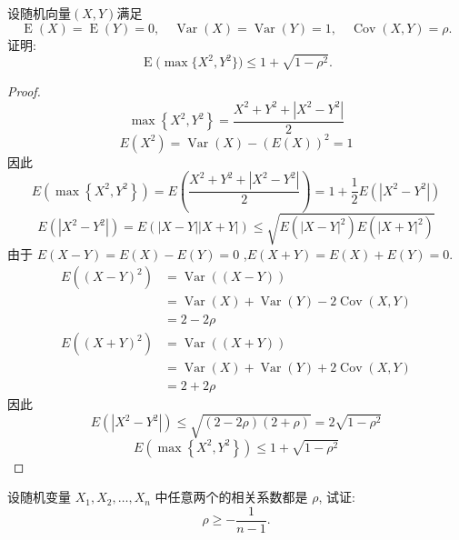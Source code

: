 \documentclass[../main.tex]{subfiles}
\begin{document}
\begin{exercise}{}{}
设随机向量\((X,Y)\)满足
\[
\operatorname{E}(X)=\operatorname{E}(Y)=0,\quad \operatorname{Var}(X)=\operatorname{Var}(Y)=1,\quad \operatorname{Cov}(X,Y)=\rho.
\]
证明:
\[
\operatorname{E}\bigl(\max\{X^{2},Y^{2}\}\bigr)\le 1+\sqrt{1-\rho^{2}}.
\]
\end{exercise}

\begin{proof}
   \[
   \max \left\{ X^{2},Y^{2} \right\}= \frac{X^{2}+ Y^{2}+ \left| X^{2}-Y^{2} \right|  }{2 } 
   \] \[
   E\left( X^{2} \right)= \operatorname{Var}\left( X \right)-\left( E\left( X \right)  \right)^{2}= 1   
   \]因此 \[
   E\left( \max \left\{ X^{2},Y^{2} \right\} \right)= E\left( \frac{X^{2}+ Y^{2}+ \left| X^{2}-Y^{2} \right|  }{2 }  \right)= 1+  \frac{1}{2}E\left( \left| X^{2}-Y^{2} \right|  \right)   
   \] \[
   E\left( \left| X^{2}-Y^{2}  \right| \right)= E\left( \left| X-Y \right|\left| X+ Y \right|   \right)  \le \sqrt{E\left( \left| X-Y \right|^{2}  \right)E\left( \left| X+ Y \right|^{2}  \right)  }
   \]由于 \(  E\left( X-Y \right)= E\left( X \right)-E\left( Y \right)= 0     \) ,\(  E\left( X+ Y \right)= E\left( X \right)+ E\left( Y \right)= 0     \). \[
   \begin{aligned}
   E\left( \left( X-Y \right)^{2}  \right)&=\operatorname{Var}\left( \left( X-Y \right)  \right) \\ 
    &= \operatorname{Var}\left( X \right)+ \operatorname{Var}\left( Y \right)- 2 \operatorname{Cov}\left( X,Y \right)\\ 
     &=    2-2\rho 
   \end{aligned}
   \] \[
   \begin{aligned}
   E\left( \left( X+ Y \right)^{2}  \right)&= \operatorname{Var} \left( \left( X+ Y \right)  \right)  \\ 
    &= \operatorname{Var}\left( X \right)+ \operatorname{Var}\left( Y \right)+ 2 \operatorname{Cov}\left( X,Y \right)\\ 
     &= 2+ 2\rho    
   \end{aligned}
   \]因此 \[
   E\left( \left| X^{2}-Y^{2} \right|  \right)\le \sqrt{\left( 2-2\rho  \right)\left( 2+ \rho  \right)  }= 2\sqrt{1-\rho ^{2}} 
   \] \[
   E\left( \max \left\{ X^{2},Y^{2} \right\} \right)\le 1+ \sqrt{1-\rho ^{2}} 
   \]
\end{proof}

\begin{exercise}{}{}
设随机变量 \(X_{1},X_{2},\ldots,X_{n}\) 中任意两个的相关系数都是 \(\rho\), 试证:
\[
\rho\ge -\frac{1}{n-1}.
\]
\end{exercise}
\end{document}
